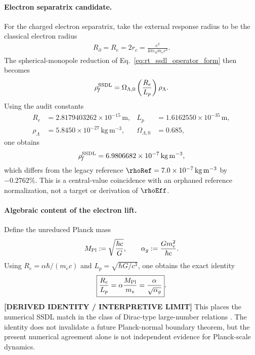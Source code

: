 \paragraph{Electron separatrix candidate.}
For the charged electron separatrix, take the external response radius to
be the classical electron radius
\begin{align}
    R_\partial=R_e=2r_c
    =
    \frac{e^2}{4\pi\varepsilon_0m_ec^2} .
\end{align}
The spherical-monopole reduction of Eq.~\eqref{eq:rt_ssdl_operator_form}
then becomes
\begin{align}
    \rho_{\!f}^{\rm SSDL}
    =
    \Omega_{\Lambda,0}
    \left(\frac{R_e}{L_p}\right)
    \rho_\Lambda .
    \label{eq:rt_ssdl_electron_candidate}
\end{align}
Using the audit constants
\begin{align}
    R_e&=2.8179403262\times10^{-15}\,\mathrm{m},
    &L_p&=1.6162550\times10^{-35}\,\mathrm{m},
    \\
    \rho_\Lambda&=5.8450\times10^{-27}\,\mathrm{kg\,m^{-3}},
    &\Omega_{\Lambda,0}&=0.685,
\end{align}
one obtains
\begin{align}
    \rho_{\!f}^{\rm SSDL}
    =
    6.9806682\times10^{-7}\,\mathrm{kg\,m^{-3}},
\end{align}
which differs from the legacy reference
\(\rhoRef=7.0\times10^{-7}\,\mathrm{kg\,m^{-3}}\) by
\(-0.2762\%\).  This is a central-value coincidence with an orphaned
reference normalization, not a target or derivation of \(\rhoEff\).

\paragraph{Algebraic content of the electron lift.}
Define the unreduced Planck mass
\begin{align}
    M_{\rm Pl}
    :=
    \sqrt{\frac{\hbar c}{G}},
    \qquad
    \alpha_g
    :=
    \frac{Gm_e^2}{\hbar c} .
\end{align}
Using \(R_e=\alpha\hbar/(m_ec)\) and
\(L_p=\sqrt{\hbar G/c^3}\), one obtains the exact identity
\begin{align}
    \boxed{
    \frac{R_e}{L_p}
    =
    \alpha\frac{M_{\rm Pl}}{m_e}
    =
    \frac{\alpha}{\sqrt{\alpha_g}}
    } .
    \label{eq:rt_ssdl_large_number_identity}
\end{align}
\textbf{[DERIVED IDENTITY / INTERPRETIVE LIMIT]} This places the numerical
SSDL match in the class of Dirac-type large-number relations
\cite{Dirac1938LargeNumbers}.  The identity does not invalidate a future
Planck-normal boundary theorem, but the present numerical agreement alone is
not independent evidence for Planck-scale dynamics.

